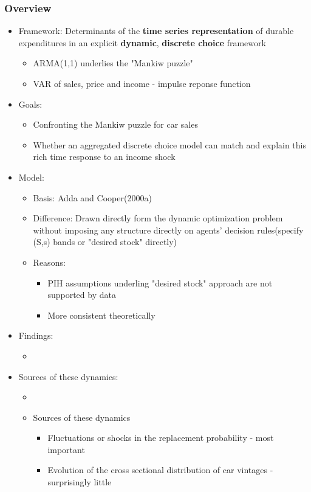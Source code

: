 \documentclass{beamer}
\begin{document}
\begin{frame}[allowframebreaks]
\frametitle{Overview}
\begin{itemize}
\item Framework: Determinants of the \textbf{time series representation} of durable expenditures in an explicit \textbf{dynamic}, \textbf{discrete choice} framework
    \begin{itemize}
    \item ARMA(1,1) underlies the "Mankiw puzzle"
    \item VAR of sales, price and income - impulse reponse function
    \end{itemize}
\item Goals:
  \begin{itemize}
  \item Confronting the Mankiw puzzle for car sales
  \item Whether an aggregated discrete choice model can match and explain this rich time response to an income shock
  \end{itemize}

\framebreak
\item Model:
  \begin{itemize}
  \item Basis: Adda and Cooper(2000a)
  \item Difference: Drawn directly form the dynamic optimization problem without imposing any structure directly on agents' decision rules(specify (S,s) bands or "desired stock" directly) %
  \item Reasons:
    \begin{itemize}
    \item PIH assumptions underling "desired stock" approach are not supported by data
    \item More consistent theoretically %
    \end{itemize}
  \end{itemize}

\framebreak
\item Findings:
  \begin{itemize}
  \item
  \end{itemize}
\framebreak
\item Sources of these dynamics:
  \begin{itemize}
  \item %
  \item Sources of these dynamics
    \begin{itemize}
    \item Fluctuations or shocks in the replacement probability - most important
    \item Evolution of the cross sectional distribution of car vintages - surprisingly little
    \end{itemize}
  \end{itemize}
\end{itemize}
\end{frame}
\end{document}
